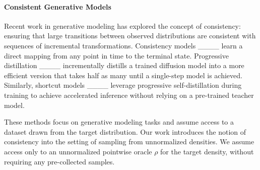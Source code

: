 \paragraph{Consistent Generative Models}
Recent work in generative modeling has explored the concept of consistency: ensuring that large transitions between observed distributions are consistent with sequences of incremental transformations. 
Consistency models ____ 
learn a direct mapping from any point in time to the terminal state. 
Progressive distillation ____ incrementally distills a trained diffusion model into a more efficient version that takes half as many until a single-step model is achieved.
Similarly, shortcut models ____ leverage progressive self-distillation during training to achieve accelerated inference without relying on a pre-trained teacher model.

These methods focus on generative modeling tasks and assume access to a dataset drawn from the target distribution.
Our work introduces the notion of consistency into the setting of sampling from unnormalized densities. 
We assume access only to an unnormalized pointwise oracle $\rho$ for the target density, without requiring any pre-collected samples.